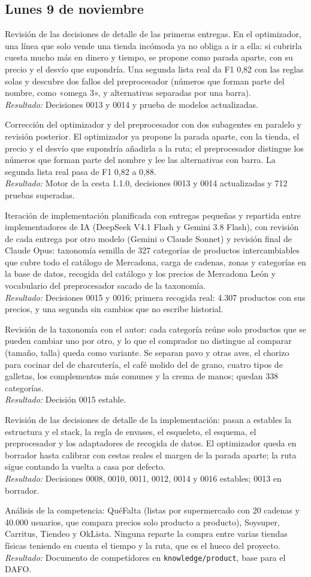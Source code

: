 \documentclass[11pt,a4paper]{article}
\newcommand{\actividad}[3]{\item[\textbf{[#1]}] #2 \\ \textit{Resultado:} #3}
\begin{document}
	\subsection*{Lunes 9 de noviembre}
	\begin{description}[leftmargin=0pt, itemsep=6pt]
		\actividad{Análisis}{Revisión de las decisiones de detalle de las primeras entregas. En el optimizador, una línea que solo vende una tienda incómoda ya no obliga a ir a ella: si cubrirla cuesta mucho más en dinero y tiempo, se propone como parada aparte, con su precio y el desvío que supondría. Una segunda lista real da F1 0,82 con las reglas solas y descubre dos fallos del preprocesador (números que forman parte del nombre, como «omega 3», y alternativas separadas por una barra).}{Decisiones 0013 y 0014 y prueba de modelos actualizadas.}
		\actividad{Tarea}{Corrección del optimizador y del preprocesador con dos subagentes en paralelo y revisión posterior. El optimizador ya propone la parada aparte, con la tienda, el precio y el desvío que supondría añadirla a la ruta; el preprocesador distingue los números que forman parte del nombre y lee las alternativas con barra. La segunda lista real pasa de F1 0,82 a 0,88.}{Motor de la cesta 1.1.0, decisiones 0013 y 0014 actualizadas y 712 pruebas superadas.}
		\actividad{Tarea}{Iteración de implementación planificada con entregas pequeñas y repartida entre implementadores de IA (DeepSeek V4.1 Flash y Gemini 3.8 Flash), con revisión de cada entrega por otro modelo (Gemini o Claude Sonnet) y revisión final de Claude Opus: taxonomía semilla de 327 categorías de productos intercambiables que cubre todo el catálogo de Mercadona, carga de cadenas, zonas y categorías en la base de datos, recogida del catálogo y los precios de Mercadona León y vocabulario del preprocesador sacado de la taxonomía.}{Decisiones 0015 y 0016; primera recogida real: 4.307 productos con sus precios, y una segunda sin cambios que no escribe historial.}
		\actividad{Análisis}{Revisión de la taxonomía con el autor: cada categoría reúne solo productos que se pueden cambiar uno por otro, y lo que el comprador no distingue al comparar (tamaño, talla) queda como variante. Se separan pavo y otras aves, el chorizo para cocinar del de charcutería, el café molido del de grano, cuatro tipos de galletas, los complementos más comunes y la crema de manos; quedan 338 categorías.}{Decisión 0015 estable.}
		\actividad{Decisión}{Revisión de las decisiones de detalle de la implementación: pasan a estables la estructura y el stack, la regla de envases, el esqueleto, el esquema, el preprocesador y los adaptadores de recogida de datos. El optimizador queda en borrador hasta calibrar con cestas reales el margen de la parada aparte; la ruta sigue contando la vuelta a casa por defecto.}{Decisiones 0008, 0010, 0011, 0012, 0014 y 0016 estables; 0013 en borrador.}
		\actividad{Investigación}{Análisis de la competencia: QuéFalta (listas por supermercado con 20 cadenas y 40.000 usuarios, que compara precios solo producto a producto), Soysuper, Carritus, Tiendeo y OkLista. Ninguna reparte la compra entre varias tiendas físicas teniendo en cuenta el tiempo y la ruta, que es el hueco del proyecto.}{Documento de competidores en \texttt{knowledge/product}, base para el DAFO.}
	\end{description}
\end{document}
